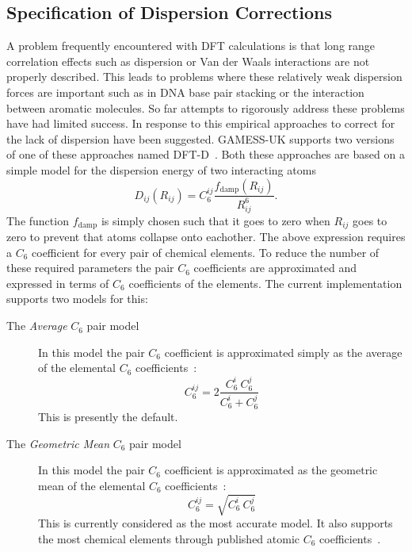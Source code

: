 \documentclass[11pt,fleqn]{article}
\begin{document}
\subsection{Specification of Dispersion Corrections}
\label{DFT-dispersion-corr}

A problem frequently encountered with DFT calculations is that long range
correlation effects such as dispersion or Van der Waals interactions are not
properly described. This leads to problems where these relatively weak 
dispersion forces are important such as in DNA base pair stacking or the 
interaction between aromatic molecules. So far attempts to rigorously address
these problems have had limited success. In response to this empirical 
approaches to correct for the lack of dispersion have been suggested. GAMESS-UK
supports two versions of one of these approaches named
DFT-D~\cite{grimme04,grimme06,antony06}. 
Both these approaches are based on a simple
model for the dispersion energy of two interacting atoms
\begin{equation}
D_{ij}(R_{ij}) = C_6^{ij}\frac{f_{\mathrm{damp}}(R_{ij})}{R^{6}_{ij}}.
\end{equation}
The function $f_{\mathrm{damp}}$ is simply chosen such that it goes to zero
when $R_{ij}$ goes to zero to prevent that atoms collapse onto eachother.
The above expression requires a $C_6$ coefficient for every pair of chemical
elements. To reduce the number of these required parameters the pair $C_6$
coefficients are approximated and expressed in terms of $C_6$ coefficients of
the elements. The current implementation supports two models for this:
\begin{description}
\item[The {\em Average} $C_6$ pair model]
     In this model the pair $C_6$ coefficient is approximated simply as the
     average of the elemental $C_6$ coefficients~\cite{grimme04}:
     \begin{equation}
        C_6^{ij} = 2\frac{C_6^i~C_6^j}{C_6^i + C_6^j}
     \end{equation}
     This is presently the default.
\item[The {\em Geometric Mean} $C_6$ pair model]
     In this model the pair $C_6$ coefficient is approximated as the
     geometric mean of the elemental $C_6$
     coefficients~\cite{grimme06,antony06}:
     \begin{equation}
        C_6^{ij} = \sqrt{C_6^i~C_6^j}
     \end{equation}
     This is currently considered as the most accurate model. It also supports
     the most chemical elements through published atomic $C_6$
     coefficients~\cite{grimme06}.
\end{description}
\end{document}
